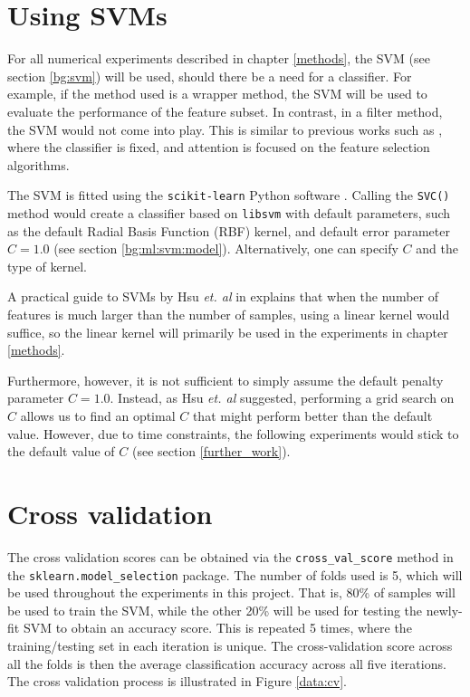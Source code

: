 \documentclass[12pt, twoside, a4paper]{report}
\begin{document}
\section{Using SVMs} \label{data:svms}

For all numerical experiments described in chapter \ref{methods}, the SVM (see section \ref{bg:svm}) will be used, should there be a need for a classifier. For example, if the method used is a wrapper method, the SVM will be used to evaluate the performance of the feature subset. In contrast, in a filter method, the SVM would not come into play. This is similar to previous works such as \cite{RefWorks:216}, where the classifier is fixed, and attention is focused on the feature selection algorithms.

The SVM is fitted using the \texttt{scikit-learn} Python software \cite{scikit-learn}. Calling the \texttt{SVC()} method would create a classifier based on \texttt{libsvm} \cite{libsvm} with default parameters, such as the default Radial Basis Function (RBF) kernel, and default error parameter $C=1.0$ (see section \ref{bg:ml:svm:model}). Alternatively, one can specify $C$ and the type of kernel.

A practical guide to SVMs by Hsu \textit{et. al} in \cite{RefWorks:128} explains that when the number of features is much larger than the number of samples, using a linear kernel would suffice, so the linear kernel will primarily be used in the experiments in chapter \ref{methods}.


Furthermore, however, it is not sufficient to simply assume the default penalty parameter $C=1.0$. Instead, as Hsu \textit{et. al} suggested, performing a grid search on $C$ allows us to find an optimal $C$ that might perform better than the default value. However, due to time constraints, the following experiments would stick to the default value of $C$ (see section \ref{further_work}).



\section{Cross validation}
The cross validation scores can be obtained via the \texttt{cross\_val\_score} method in the \texttt{sklearn.model\_selection} package. The number of folds used is 5, which will be used throughout the experiments in this project. That is, 80\% of samples will be used to train the SVM, while the other 20\% will be used for testing the newly-fit SVM to obtain an accuracy score. This is repeated 5 times, where the training/testing set in each iteration is unique. The cross-validation score across all the folds is then the average classification accuracy across all five iterations. The cross validation process is illustrated in Figure \ref{data:cv}.
\end{document}
